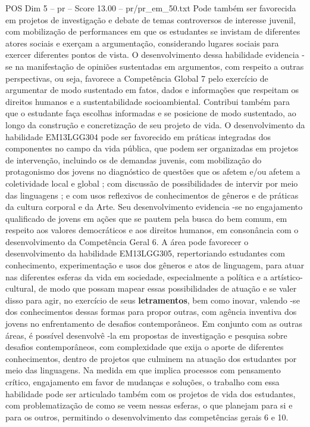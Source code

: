 \begin{textsample}{POS Dim 5 – pr – Score 13.00 – pr/pr\_em\_50.txt}
Pode também ser favorecida em projetos de investigação e debate de temas controversos de interesse juvenil, com mobilização de performances em que os estudantes se invistam de diferentes atores sociais e exerçam a argumentação, considerando lugares sociais para exercer diferentes pontos de vista.
O desenvolvimento dessa habilidade evidencia -se na manifestação de opiniões sustentadas em argumentos, com respeito a outras perspectivas, ou seja, favorece a Competência Global 7 pelo exercício de argumentar de modo sustentado em fatos, dados e informações que respeitam os direitos humanos e a sustentabilidade socioambiental.
Contribui também para que o estudante faça escolhas informadas e se posicione de modo sustentado, ao longo da construção e concretização de seu projeto de vida.
O desenvolvimento da habilidade EM13LGG304 pode ser favorecido em práticas integradas dos componentes no campo da vida pública, que podem ser organizadas em projetos de intervenção, incluindo os de demandas juvenis, com mobilização do protagonismo dos jovens no diagnóstico de questões que os afetem e/ou afetem a coletividade local e global ; com discussão de possibilidades de intervir por meio das linguagens ; e com usos reflexivos de conhecimentos de gêneros e de práticas da cultura corporal e da Arte.
Seu desenvolvimento evidencia -se no engajamento qualificado de jovens em ações que se pautem pela busca do bem comum, em respeito aos valores democráticos e aos direitos humanos, em consonância com o desenvolvimento da Competência Geral 6.
A área pode favorecer o desenvolvimento da habilidade EM13LGG305, repertoriando estudantes com conhecimento, experimentação e usos dos gêneros e atos de linguagem, para atuar nas diferentes esferas da vida em sociedade, especialmente a política e a artístico-cultural, de modo que possam mapear essas possibilidades de atuação e se valer disso para agir, no exercício de seus \textbf{letramentos}, bem como inovar, valendo -se dos conhecimentos dessas formas para propor outras, com agência inventiva dos jovens no enfrentamento de desafios contemporâneos.
Em conjunto com as outras áreas, é possível desenvolvê -la em propostas de investigação e pesquisa sobre desafios contemporâneos, com complexidade que exija o aporte de diferentes conhecimentos, dentro de projetos que culminem na atuação dos estudantes por meio das linguagens.
Na medida em que implica processos com pensamento crítico, engajamento em favor de mudanças e soluções, o trabalho com essa habilidade pode ser articulado também com os projetos de vida dos estudantes, com problematização de como se veem nessas esferas, o que planejam para si e para os outros, permitindo o desenvolvimento das competências gerais 6 e 10.

\end{textsample}
